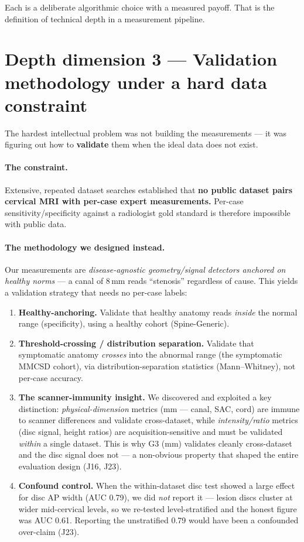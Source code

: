 \documentclass[11pt]{article}
\begin{document}
Each is a deliberate algorithmic choice with a measured payoff. That is the definition of technical depth
in a measurement pipeline.

\section{Depth dimension 3 --- Validation methodology under a hard data constraint}
The hardest intellectual problem was not building the measurements --- it was figuring out how to
\textbf{validate} them when the ideal data does not exist.

\paragraph{The constraint.} Extensive, repeated dataset searches established that \textbf{no public
dataset pairs cervical MRI with per-case expert measurements.} Per-case sensitivity/specificity against a
radiologist gold standard is therefore impossible with public data.

\paragraph{The methodology we designed instead.} Our measurements are \emph{disease-agnostic
geometry/signal detectors anchored on healthy norms} --- a canal of 8\,mm reads ``stenosis'' regardless
of cause. This yields a validation strategy that needs no per-case labels:
\begin{enumerate}
  \item \textbf{Healthy-anchoring.} Validate that healthy anatomy reads \emph{inside} the normal range
  (specificity), using a healthy cohort (Spine-Generic).
  \item \textbf{Threshold-crossing / distribution separation.} Validate that symptomatic anatomy
  \emph{crosses} into the abnormal range (the symptomatic MMCSD cohort), via distribution-separation
  statistics (Mann--Whitney), not per-case accuracy.
  \item \textbf{The scanner-immunity insight.} We discovered and exploited a key distinction:
  \emph{physical-dimension} metrics (mm --- canal, SAC, cord) are immune to scanner differences and
  validate cross-dataset, while \emph{intensity/ratio} metrics (disc signal, height ratios) are
  acquisition-sensitive and must be validated \emph{within} a single dataset. This is why G3 (mm)
  validates cleanly cross-dataset and the disc signal does not --- a non-obvious property that shaped the
  entire evaluation design (J16, J23).
  \item \textbf{Confound control.} When the within-dataset disc test showed a large effect for disc AP
  width (AUC 0.79), we did \emph{not} report it --- lesion discs cluster at wider mid-cervical levels, so
  we re-tested level-stratified and the honest figure was AUC 0.61. Reporting the unstratified 0.79 would
  have been a confounded over-claim (J23).
\end{enumerate}
\end{document}
